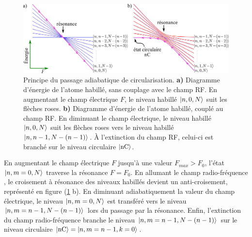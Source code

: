 \begin{figure}[h]
\centering
\includegraphics[width=\linewidth]{figures/circulars/passage_adiab_hydrogen}
\caption[Principe du passage adiabatique de circularisation]{
Principe du passage adiabatique de circularisation.
\textbf{a)} Diagramme d'énergie de l'atome habillé, sans couplage avec le champ RF.
En augmentant le champ électrique $F$, le niveau habillé $\ket{n,0,N}$ suit les flèches roses.
\textbf{b)} Diagramme d'énergie de l'atome habillé, couplé au champ RF.
En diminuant le champ électrique, le niveau habillé $\ket{n,0,N}$ suit les flèches roses vers le niveau habillé $\ket{n,n-1,N-(n-1)}$. \`A l'extinction du champ RF, celui-ci est branché sur le niveau circulaire $\ket{\mathrm{nC}}$.
}
\label{fig:passage_adiab_hydrogen}
\end{figure} 

En augmentant le champ électrique $F$ jusqu'à une valeur $F_{max}>F_0$, l'état \linebreak $\ket{n,m=0,N}$ traverse la résonance $F=F_0$.
En allumant le champ radio-fréquence%
, le croisement à résonance des niveaux habillés devient un anti-croisement, représenté en figure (\ref{fig:passage_adiab_hydrogen} b).
En diminuant adiabatiquement la valeur du champ électrique, le niveau $\ket{n,m=0,N}$ est transféré vers le niveau $\ket{n,m=n-1,N-(n-1)}$ lors du passage par la résonance.
Enfin, l'extinction du champ radio-fréquence branche le niveau \linebreak $\ket{n,m=n-1,N-(n-1)}$ sur le niveau circulaire $\ket{\mathrm{nC}} = \ket{n,m=n-1,k=0}$.


